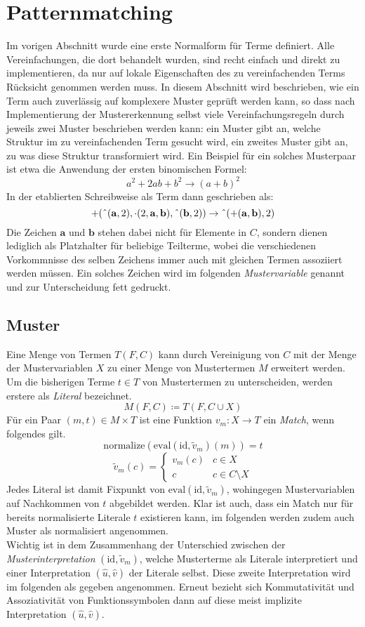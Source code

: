 \documentclass{scrartcl}
\numberwithin{figure}{section} %
\theoremstyle{definition} %
\begin{document}
\section{Patternmatching} \label{secPattermatching}
Im vorigen Abschnitt wurde eine erste Normalform für Terme definiert. Alle Vereinfachungen, die dort behandelt wurden, sind recht einfach und direkt zu implementieren, da nur auf lokale Eigenschaften des zu vereinfachenden Terms Rücksicht genommen werden muss. In diesem Abschnitt wird beschrieben, wie ein Term auch zuverlässig auf komplexere Muster geprüft werden kann, so dass nach Implementierung der Mustererkennung selbst viele Vereinfachungsregeln durch jeweils zwei Muster beschrieben werden kann: ein Muster gibt an, welche Struktur im zu vereinfachenden Term gesucht wird, ein zweites Muster gibt an, zu was diese Struktur transformiert wird. Ein Beispiel für ein solches Musterpaar ist etwa die Anwendung der ersten binomischen Formel:
$$a^2 + 2 a b + b^2 \rightarrow (a + b)^2$$
In der etablierten Schreibweise als Term dann geschrieben als:
$$+(\string^(\mathbf a, 2), \cdot(2, \mathbf a, \mathbf b), \string^(\mathbf b, 2)) \rightarrow \string^(+(\mathbf a, \mathbf b), 2)$$
Die Zeichen $\mathbf a$ und $\mathbf b$ stehen dabei nicht für Elemente in $C$, sondern dienen lediglich als Platzhalter für beliebige Teilterme, wobei die verschiedenen Vorkommnisse des selben Zeichens immer auch mit gleichen Termen assoziiert werden müssen. Ein solches Zeichen wird im folgenden \emph{Mustervariable} genannt und zur Unterscheidung fett gedruckt.

\subsection{Muster}
Eine Menge von Termen $T(F, C)$ kann durch Vereinigung von $C$ mit der Menge der Mustervariablen $X$ zu einer Menge von Mustertermen $M$ erweitert werden. 
Um die bisherigen Terme $t \in T$ von Mustertermen zu unterscheiden, werden erstere als \emph{Literal} bezeichnet.
$$M(F, C) \coloneqq T(F, C \cup X)$$
Für ein Paar $(m, t) \in M \times T$ ist eine Funktion $v_m \colon X \rightarrow T$ ein \emph{Match}, wenn folgendes gilt.
$$\mathrm{normalize}(\mathrm{eval}(\mathrm{id}, \tilde v_m)(m))= t$$
$$\tilde v_m(c) = \begin{cases}
	v_m(c) & c \in X\\
	c         & c \in C \setminus X
\end{cases}$$
Jedes Literal ist damit Fixpunkt von $\mathrm{eval}(\mathrm{id}, \tilde v_m)$, wohingegen Mustervariablen auf Nachkommen von $t$ abgebildet werden. 
Klar ist auch, dass ein Match nur für bereits normalisierte Literale $t$ existieren kann, im folgenden werden zudem auch Muster als normalisiert angenommen.\\
Wichtig ist in dem Zusammenhang der Unterschied zwischen der \emph{Musterinterpretation} $(\mathrm{id}, \tilde v_m)$, welche Musterterme als Literale interpretiert und einer Interpretation $(\hat{u}, \hat{v})$ der Literale selbst. Diese zweite Interpretation wird im folgenden als gegeben angenommen. Erneut bezieht sich Kommutativität und Assoziativität von Funktionssymbolen dann auf diese meist implizite Interpretation $(\hat u, \hat v)$.\\
\end{document}
